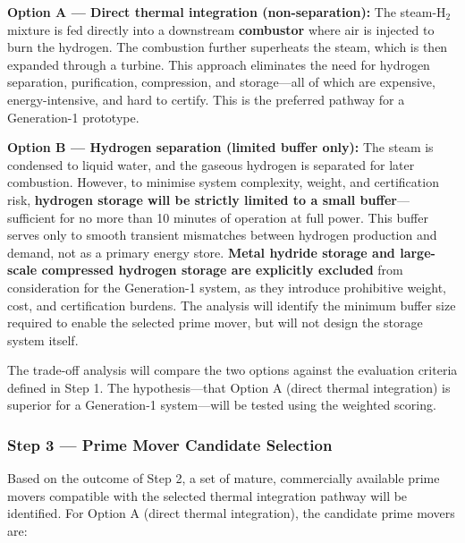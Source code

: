 \documentclass[12pt]{article}
\begin{document}
\textbf{Option A — Direct thermal integration (non-separation):}
The steam-H$_2$ mixture is fed directly into a downstream \textbf{combustor} where air is injected to burn the hydrogen. The combustion further superheats the steam, which is then expanded through a turbine. This approach eliminates the need for hydrogen separation, purification, compression, and storage—all of which are expensive, energy-intensive, and hard to certify. This is the preferred pathway for a Generation-1 prototype.

\textbf{Option B — Hydrogen separation (limited buffer only):}
The steam is condensed to liquid water, and the gaseous hydrogen is separated for later combustion. However, to minimise system complexity, weight, and certification risk, \textbf{hydrogen storage will be strictly limited to a small buffer}—sufficient for no more than 10 minutes of operation at full power. This buffer serves only to smooth transient mismatches between hydrogen production and demand, not as a primary energy store. \textbf{Metal hydride storage and large-scale compressed hydrogen storage are explicitly excluded} from consideration for the Generation-1 system, as they introduce prohibitive weight, cost, and certification burdens. The analysis will identify the minimum buffer size required to enable the selected prime mover, but will not design the storage system itself.

The trade-off analysis will compare the two options against the evaluation criteria defined in Step 1. The hypothesis—that Option A (direct thermal integration) is superior for a Generation-1 system—will be tested using the weighted scoring.

\subsubsection*{Step 3 — Prime Mover Candidate Selection}

Based on the outcome of Step 2, a set of mature, commercially available prime movers compatible with the selected thermal integration pathway will be identified. For Option A (direct thermal integration), the candidate prime movers are:
\end{document}
